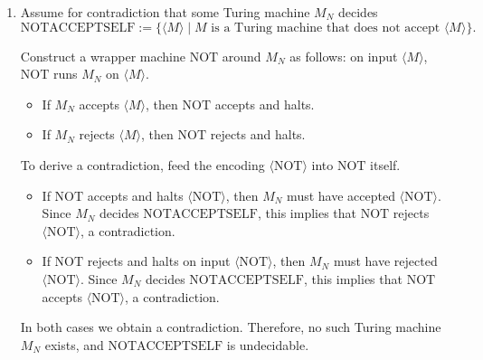 \documentclass[12pt]{article}
\begin{document}
\begin{solution}
\begin{enumerate}
\begin{itemize}
                \item If $\text{REJECTOR}$ rejects and halts on input $\langle \text{REJECTOR} \rangle$, then $M_R$ must have rejected $\langle \text{REJECTOR} \rangle$. Since $M_R$ decides $\text{REJECTSELF}$, this implies that $\text{REJECTOR}$ accepts $\langle \text{REJECTOR} \rangle$, a contradiction.
            \end{itemize}
            
            In both cases we obtain a contradiction. Therefore, no such Turing machine $M_R$ exists, and $\text{REJECTSELF}$ is undecidable.

            \item Assume for contradiction that some Turing machine $M_N$ decides
            \[
            \text{NOTACCEPTSELF} := \{\langle M \rangle \mid M \text{ is a Turing machine that does not accept } \langle M \rangle\}.
            \]
            
            Construct a wrapper machine $\text{NOT}$ around $M_N$ as follows: on input $\langle M \rangle$, $\text{NOT}$ runs $M_N$ on $\langle M \rangle$.
            
            \begin{itemize}
                \item If $M_N$ accepts $\langle M \rangle$, then $\text{NOT}$ accepts and halts.
                \item If $M_N$ rejects $\langle M \rangle$, then $\text{NOT}$ rejects and halts.
            \end{itemize}
            
            To derive a contradiction, feed the encoding $\langle \text{NOT} \rangle$ into $\text{NOT}$ itself.
            
            \begin{itemize}
                \item If $\text{NOT}$ accepts and halts $\langle \text{NOT} \rangle$, then $M_N$ must have accepted $\langle \text{NOT} \rangle$. Since $M_N$ decides $\text{NOTACCEPTSELF}$, this implies that $\text{NOT}$ rejects $\langle \text{NOT} \rangle$, a contradiction.
            
                \item If $\text{NOT}$ rejects and halts on input $\langle \text{NOT} \rangle$, then $M_N$ must have rejected $\langle \text{NOT} \rangle$. Since $M_N$ decides $\text{NOTACCEPTSELF}$, this implies that $\text{NOT}$ accepts $\langle \text{NOT} \rangle$, a contradiction.
            \end{itemize}
            
            In both cases we obtain a contradiction. Therefore, no such Turing machine $M_N$ exists, and $\text{NOTACCEPTSELF}$ is undecidable.
    \end{enumerate}
\end{solution}
\end{document}
